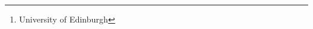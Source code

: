 \documentclass{article}
\author{Vasilis Tsiatouras \thanks{University of Edinburgh} \and ...}
\begin{document}
\nocite{*}

%

\end{document}
